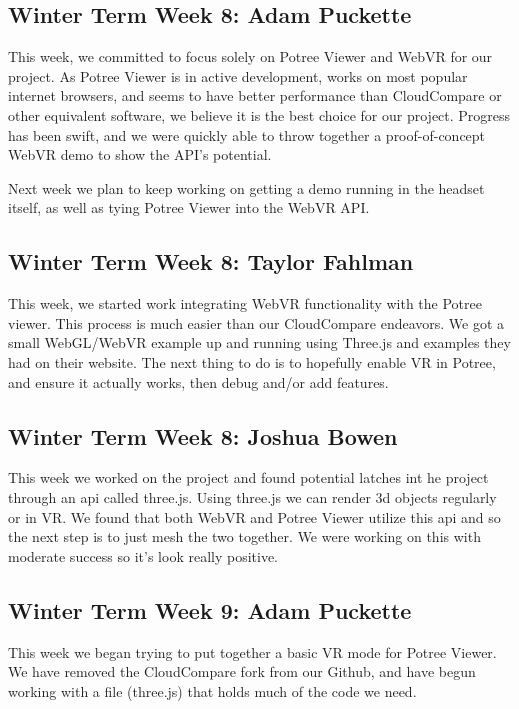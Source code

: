 \documentclass[draftclsnofoot,onecolumn]{IEEEtran}
\begin{document}
\subsection{Winter Term Week 8: Adam Puckette}

This week, we committed to focus solely on Potree Viewer and WebVR for our project. As Potree Viewer is in active development, works on most popular internet browsers, and seems to have better performance than CloudCompare or other equivalent software, we believe it is the best choice for our project. Progress has been swift, and we were quickly able to throw together a proof-of-concept WebVR demo to show the API's potential.

Next week we plan to keep working on getting a demo running in the headset itself, as well as tying Potree Viewer into the WebVR API.

\subsection{Winter Term Week 8: Taylor Fahlman}

This week, we started work integrating WebVR functionality with the Potree viewer. This process is much easier than our CloudCompare endeavors. We got a small WebGL/WebVR example up and running using Three.js and examples they had on their website. The next thing to do is to hopefully enable VR in Potree, and ensure it actually works, then debug and/or add features.

\subsection{Winter Term Week 8: Joshua Bowen}

This week we worked on the project and found potential latches int he project through an api called three.js. Using three.js we can render 3d objects regularly or in VR. We found that both WebVR and Potree Viewer utilize this api and so the next step is to just mesh the two together. We were working on this with moderate success so it's look really positive.

\subsection{Winter Term Week 9: Adam Puckette}

This week we began trying to put together a basic VR mode for Potree Viewer. We have removed the CloudCompare fork from our Github, and have begun working with a file (three.js) that holds much of the code we need.
\end{document}
